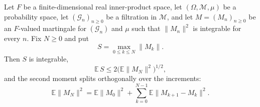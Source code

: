\begin{lemma}
Let $F$ be a finite-dimensional real inner-product space, let
$(\Omega,\mathcal M,\mu)$ be a probability space, let $(\mathcal G_n)_{n\ge0}$
be a filtration in $\mathcal M$, and let $M=(M_n)_{n\ge0}$ be an $F$-valued
martingale for $(\mathcal G_n)$ and $\mu$ such that $\|M_n\|^2$ is integrable
for every $n$. Fix $N\ge0$ and put
\[
  S=\max_{0\le k\le N}\|M_k\| .
\]
Then $S$ is integrable,
\begin{equation}\label{eq:doob-l2}
  \mathbb E\,S\le2\bigl(\mathbb E\|M_N\|^2\bigr)^{1/2},
\end{equation}
and the second moment splits orthogonally over the increments:
\begin{equation}\label{eq:doob-orthogonality}
  \mathbb E\|M_N\|^2
    =\mathbb E\|M_0\|^2
       +\sum_{k=0}^{N-1}\mathbb E\|M_{k+1}-M_k\|^2 .
\end{equation}
\end{lemma}

